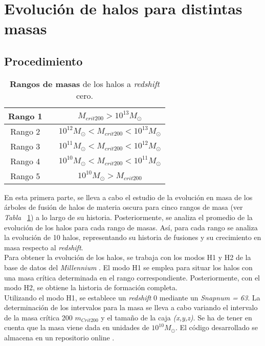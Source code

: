 \section{Evolución de halos para distintas masas} 
\label{sec:2} %

\subsection{Procedimiento}
\label{subsec:2_A}

\begin{table}[H]
\begin{center}
\begin{tabular}{ccc}
\toprule
\cellcolor[gray]{0.9}Rango 1 & & $M_{crit200}>10^{13}M_\odot$ \\
\midrule
\cellcolor[gray]{0.9}Rango 2 & & $10^{12}M_\odot<M_{crit200}<10^{13}M_\odot$ \\
\midrule
\cellcolor[gray]{0.9}Rango 3 & & $10^{11}M_\odot<M_{crit200}<10^{12}M_\odot$ \\
\midrule
\cellcolor[gray]{0.9}Rango 4 & & $10^{10}M_\odot<M_{crit200}<10^{11}M_\odot$ \\
\midrule
\cellcolor[gray]{0.9}Rango 5 & & $10^{10}M_\odot>M_{crit200}$ \\
\bottomrule
\end{tabular}
\end{center}
\caption{\textbf{Rangos de masas} de los halos a \textit{redshift} cero.}
\label{tab:tabla2}
\end{table}

En esta primera parte, se lleva a cabo el estudio de la evolución en masa de los árboles de fusión de halos de materia oscura para cinco rangos de masa (ver \textit{Tabla} ~\ref{tab:tabla2}) a lo largo de su historia. Posteriormente, se analiza el promedio de la evolución de los halos para cada rango de masas. Así, para cada rango se analiza la evolución de 10 halos, representando su historia de fusiones y su crecimiento en masa respecto al \textit{redshift}.   \\

Para obtener la evolución de los halos, se trabaja con los modos H1 y H2 de la base de datos del \textit{Millennium} \cite{6}. El modo H1 se emplea para situar los halos con una masa crítica determinada en el rango correspondiente. Posteriormente, con el modo H2, se obtiene la historia de formación completa. \\

Utilizando el modo H1, se establece un \textit{redshift} 0 mediante un \textit{Snapnum = 63}. La determinación de los intervalos para la masa se lleva a cabo variando el intervalo de la masa crítica 200 $m_{Crit200}$ y el tamaño de la caja \textit{(x,y,z)}. Se ha de tener en cuenta que la masa viene dada en unidades de $10^{10}M_\odot$. El código desarrollado se almacena en un repositorio online \cite{9}. \\

